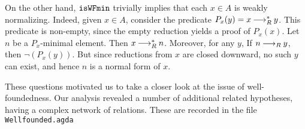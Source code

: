 On the other hand, $\mathtt{isWFmin}$ trivially implies that each $x \in A$ is weakly normalizing.
Indeed, given $x \in A$, consider the predicate $P_x(y) = x \mathbin{\longrightarrow_R^*} y$.
This predicate is non-empty, since the empty reduction yields a proof of $P_x(x)$.
Let $n$ be a $P_x$-minimal element.  Then $x \mathbin{\longrightarrow_R^*} n$.  Moreover, for any $y$,
If $n \mathbin{\longrightarrow_R} y$, then $\lnot(P_x(y))$.  But since reductions from $x$ are closed downward,
no such $y$ can exist, and hence $n$ is a normal form of $x$.

%
These questions motivated us to take a closer look at the issue of well-foundedness.
Our analysis revealed a number of additional related hypotheses, having a complex
network of relations.  %
These are recorded in the file \verb|Wellfounded.agda|


%
%
